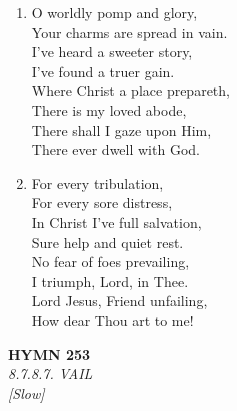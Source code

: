 \begin{enumerate}
    \item O worldly pomp and glory, \\
            Your charms are spread in vain. \\
        I've heard a sweeter story, \\
            I've found a truer gain. \\
        Where Christ a place prepareth, \\
            There is my loved abode, \\
        There shall I gaze upon Him, \\
            There ever dwell with God.

    \item For every tribulation, \\
            For every sore distress, \\
        In Christ I've full salvation, \\
            Sure help and quiet rest. \\
        No fear of foes prevailing, \\
            I triumph, Lord, in Thee. \\
        Lord Jesus, Friend unfailing, \\
            How dear Thou art to me!

\end{enumerate}

\newpage
\begin{center}
    {\Large \textbf{HYMN 253}}
    \\
    \textit{8.7.8.7. VAIL}
    \\
    \textit{\small [Slow]}
\end{center}
\vspace{1em}

